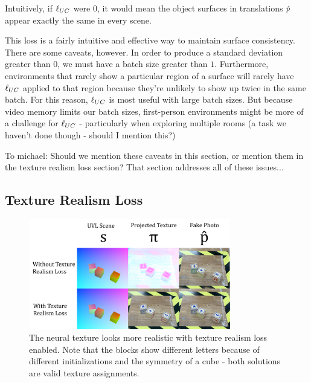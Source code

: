 \documentclass{article}
\begin{document}
	Intuitively, if $\ell_{UC}$ were $0$, it would mean the object surfaces in translations $\hat{p}$ appear exactly the same in every scene.

	This loss is a fairly intuitive and effective way to maintain surface consistency. There are some caveats, however.
	In order to produce a standard deviation greater than $0$, we must have a batch size greater than $1$.
	Furthermore, environments that rarely show a particular region of a surface will rarely have $\ell_{UC}$ applied to that region because they're unlikely to show up twice in the same batch.
	For this reason, $\ell_{UC}$ is most useful with large batch sizes.%
	But because video memory limits our batch sizes, first-person environments might be more of a challenge for $\ell_{UC}$ - particularly when exploring multiple rooms (a task we haven't done though - should I mention this?)

	To michael: Should we mention these caveats in this section, or mention them in the texture realism loss section? That section addresses all of these issues...
	

\subsection{Texture Realism Loss}
\label{sec:texture_realism_loss}

	\begin{figure}[H]
		\begin{center}
			\includegraphics[width=250pt]{../images/texture_realism_ablation.pdf}
		\end{center}
		\caption{
			The neural texture looks more realistic with texture realism loss enabled. Note that the blocks show different letters because of different initializations and the symmetry of a cube - both solutions are valid texture assignments. 
		}
		\label{fig:texture_realism_ablation}
	\end{figure}
\end{document}
